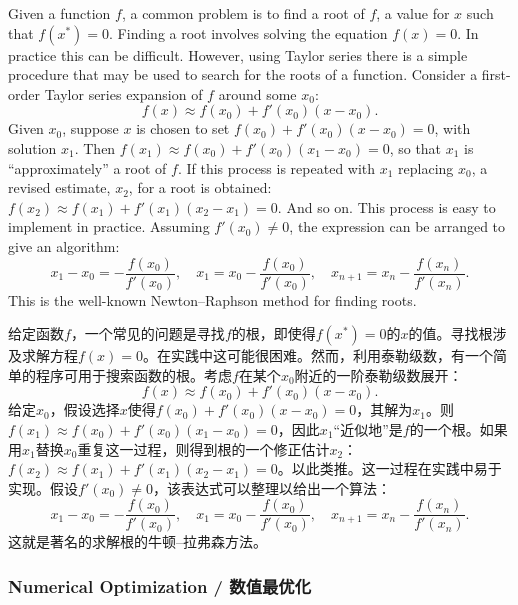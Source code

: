 \begin{original}
Given a function $f$, a common problem is to find a root of $f$, a value for $x$ such that $f(x^*) = 0$. Finding a root involves solving the equation $f(x) = 0$. In practice this can be difficult. However, using Taylor series there is a simple procedure that may be used to search for the roots of a function. Consider a first-order Taylor series expansion of $f$ around some $x_0$:
\[
f(x) \approx f(x_0) + f'(x_0)(x - x_0).
\]
Given $x_0$, suppose $x$ is chosen to set $f(x_0) + f'(x_0)(x - x_0) = 0$, with solution $x_1$. Then $f(x_1) \approx f(x_0) + f'(x_0)(x_1 - x_0) = 0$, so that $x_1$ is ``approximately'' a root of $f$. If this process is repeated with $x_1$ replacing $x_0$, a revised estimate, $x_2$, for a root is obtained: $f(x_2) \approx f(x_1) + f'(x_1)(x_2 - x_1) = 0$. And so on. This process is easy to implement in practice. Assuming $f'(x_0) \ne 0$, the expression can be arranged to give an algorithm:
\[
x_1 - x_0 = -\frac{f(x_0)}{f'(x_0)}, \quad x_1 = x_0 - \frac{f(x_0)}{f'(x_0)}, \quad x_{n+1} = x_n - \frac{f(x_n)}{f'(x_n)}.
\]
This is the well-known Newton--Raphson method for finding roots.
\end{original}
\begin{translation}
给定函数$f$，一个常见的问题是寻找$f$的根，即使得$f(x^*) = 0$的$x$的值。寻找根涉及求解方程$f(x) = 0$。在实践中这可能很困难。然而，利用泰勒级数，有一个简单的程序可用于搜索函数的根。考虑$f$在某个$x_0$附近的一阶泰勒级数展开：
\[
f(x) \approx f(x_0) + f'(x_0)(x - x_0).
\]
给定$x_0$，假设选择$x$使得$f(x_0) + f'(x_0)(x - x_0) = 0$，其解为$x_1$。则$f(x_1) \approx f(x_0) + f'(x_0)(x_1 - x_0) = 0$，因此$x_1$``近似地''是$f$的一个根。如果用$x_1$替换$x_0$重复这一过程，则得到根的一个修正估计$x_2$：$f(x_2) \approx f(x_1) + f'(x_1)(x_2 - x_1) = 0$。以此类推。这一过程在实践中易于实现。假设$f'(x_0) \ne 0$，该表达式可以整理以给出一个算法：
\[
x_1 - x_0 = -\frac{f(x_0)}{f'(x_0)}, \quad x_1 = x_0 - \frac{f(x_0)}{f'(x_0)}, \quad x_{n+1} = x_n - \frac{f(x_n)}{f'(x_n)}.
\]
这就是著名的求解根的牛顿--拉弗森方法。
\end{translation}

\subsubsection{Numerical Optimization / 数值最优化}

